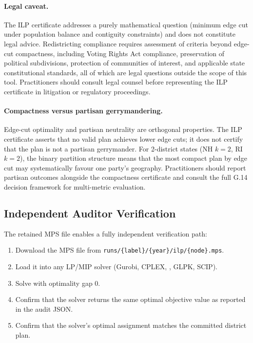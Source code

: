 \paragraph{Legal caveat.}
The ILP certificate addresses a purely mathematical question (minimum
edge cut under population balance and contiguity constraints) and does not
constitute legal advice.
Redistricting compliance requires assessment of criteria beyond edge-cut
compactness, including Voting Rights Act compliance, preservation of
political subdivisions, protection of communities of interest, and
applicable state constitutional standards, all of which are legal questions
outside the scope of this tool.
Practitioners should consult legal counsel before representing the ILP
certificate in litigation or regulatory proceedings.

\paragraph{Compactness versus partisan gerrymandering.}
Edge-cut optimality and partisan neutrality are orthogonal properties.
The ILP certificate asserts that no valid plan achieves lower edge cuts;
it does not certify that the plan is not a partisan gerrymander.
For 2-district states (NH $k=2$, RI $k=2$), the binary partition structure
means that the most compact plan by edge cut may systematically favour one
party's geography.
Practitioners should report partisan outcomes alongside the compactness
certificate and consult the full G.14 decision framework for multi-metric
evaluation.

\subsection{Independent Auditor Verification}

The retained MPS file enables a fully independent verification path:

\begin{enumerate}
\item Download the MPS file from \texttt{runs/\{label\}/\{year\}/ilp/\{node\}.mps}.
\item Load it into any LP/MIP solver (Gurobi, CPLEX, \highs{}, GLPK, SCIP).
\item Solve with optimality gap 0.
\item Confirm that the solver returns the same optimal objective value
  as reported in the audit JSON.
\item Confirm that the solver's optimal assignment matches the committed
  district plan.
\end{enumerate}


